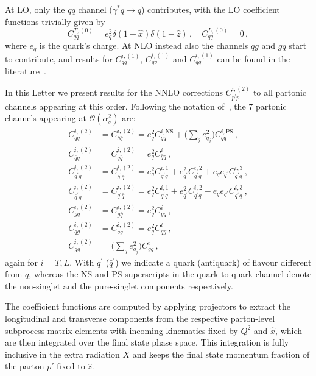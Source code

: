\documentclass[10pt,aps,prl,twocolumn,preprintnumbers,nofootinbib]{revtex4-2}
\newcommand{\hx}{\hat{x}}
\newcommand{\hz}{\hat{z}}
\newcommand{\qb}{\bar{q}}
\newcommand{\qp}{q^{\prime}}
\newcommand{\qbp}{\bar{q}^{\prime}}
\begin{document}
At LO, only the $qq$ channel ($\gamma^* q\to q$) contributes, with the LO
coefficient functions trivially given by
\begin{equation}
  C^{T,(0)}_{qq} = e_q^2 \delta(1-\hx) \delta(1-\hz)\,,\quad
  C^{L,(0)}_{qq} = 0\,,
\end{equation}
where $e_q$ is the quark's charge.  At NLO instead also the channels $qg$ and
$gq$ start to contribute, and results for $C^{i,(1)}_{qq}$, $C^{i,(1)}_{gq}$ and
$C^{i,(1)}_{qg}$ can be found in the literature~\cite{Anderle:2012rq}.

In this Letter we present results for the NNLO corrections
$C^{i,(2)}_{p^{\prime}p}$ to all partonic channels appearing at this order.
Following the notation of~\cite{Anderle:2016kwa}, the $7$ partonic channels
appearing at $\mathcal{O}(\alpha_s^2)$ are:
\begin{align}\label{CFNNLOlist}
C^{i,(2)}_{qq}&=C^{i,(2)}_{\qb\qb}=e_q^2 C^{i,\mathrm{NS}}_{qq}+\biggl( \sum_j e^2_{q_j}\biggr)C^{i,\mathrm{PS}}_{qq} \, , \nonumber \\
C^{i,(2)}_{\qb q}&=C^{i,(2)}_{q \qb}=e_q^2C^{i}_{\qb q} \, , \nonumber \\
C^{i,(2)}_{\qp q}&=C^{i,(2)}_{\qbp \qb}=e_q^2 C^{i,1}_{\qp q}+e_{\qp}^2 C^{i,2}_{\qp q}+e_q e_{\qp} C^{i,3}_{\qp q} \, , \nonumber \\
C^{i,(2)}_{\qbp q}&=C^{i,(2)}_{\qp \qb}=e_q^2 C^{i,1}_{\qp q}+e_{\qp}^2 C^{i,2}_{\qp q}-e_q e_{\qp} C^{i,3}_{\qp q} \, , \nonumber \\
C^{i,(2)}_{gq}&=C^{i,(2)}_{g \qb}=e_q^2 C^{i}_{gq} \, , \nonumber \\
C^{i,(2)}_{qg}&=C^{i,(2)}_{\qb g}=e_q^2 C^{i}_{qg} \, , \nonumber \\
C^{i,(2)}_{gg}&=\biggl( \sum_j e_{q_j}^2 \biggr) C^{i}_{gg} \,  ,
\end{align}
again for $i=T,L$. With $\qp$ ($\qbp$) we indicate a quark (antiquark) of
flavour different from $q$, whereas the NS and PS superscripts in the quark-to-quark channel denote the non-singlet and the pure-singlet components respectively.

The coefficient functions are computed by applying projectors to extract the
longitudinal and transverse components from the respective parton-level
subprocess matrix elements with incoming kinematics fixed by $Q^2$ and
$\hat{x}$, which are then integrated over the final state phase space. This
integration is fully inclusive in the extra radiation $X$ and keeps the final
state momentum fraction of the parton $p'$ fixed to $\hat{z}$.
\end{document}

